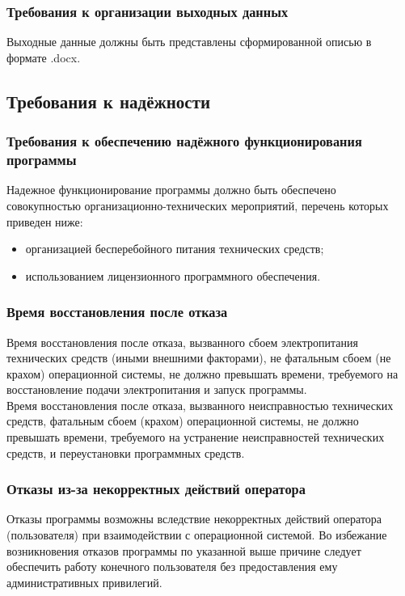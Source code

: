 \documentclass[14pt, a4paper]{extarticle}
\begin{document}
	\subsubsection{Требования к организации выходных данных}
	Выходные данные должны быть представлены сформированной описью в формате .docx.
	
	\subsection{Требования к надёжности}
	\subsubsection{Требования к обеспечению надёжного функционирования программы}
	Надежное функционирование программы должно быть обеспечено совокупностью организационно-технических мероприятий, перечень которых приведен ниже:
	\begin{itemize}
		\item организацией бесперебойного питания технических средств;
		\item использованием лицензионного программного обеспечения.
	\end{itemize}
	
	\subsubsection{Время восстановления после отказа}
	Время восстановления после отказа, вызванного сбоем электропитания технических средств (иными внешними факторами), не фатальным сбоем (не крахом) операционной системы, не должно превышать времени, требуемого на восстановление подачи электропитания и запуск программы.\\
	Время восстановления после отказа, вызванного неисправностью технических средств, фатальным сбоем (крахом) операционной системы, не должно превышать времени, требуемого на устранение неисправностей технических средств, и переустановки программных средств.
	
	\subsubsection{Отказы из-за некорректных действий оператора}
	Отказы программы возможны вследствие некорректных действий оператора (пользователя) при взаимодействии с операционной системой. Во избежание возникновения отказов программы по указанной выше причине следует обеспечить работу конечного пользователя без предоставления ему административных привилегий.
	
\end{document}

